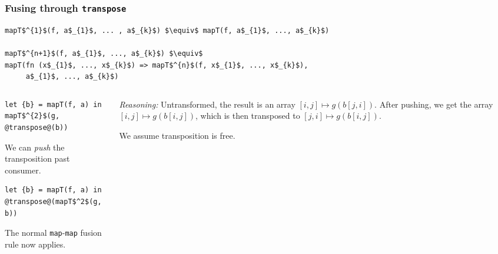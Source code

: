 \documentclass[rgb,dvipsnames]{beamer}
\begin{document}
\begin{frame}[fragile]
\frametitle{Fusing through \texttt{transpose}}

\begin{mdframed}
\scriptsize
\vspace{-1em}
\begin{lstlisting}[mathescape]
mapT$^{1}$(f, a$_{1}$, ... , a$_{k}$) $\equiv$ mapT(f, a$_{1}$, ..., a$_{k}$)

mapT$^{n+1}$(f, a$_{1}$, ..., a$_{k}$) $\equiv$
mapT(fn (x$_{1}$, ..., x$_{k}$) => mapT$^{n}$(f, x$_{1}$, ..., x$_{k}$),
     a$_{1}$, ..., a$_{k}$)
\end{lstlisting}
\vspace{-1em}
\end{mdframed}

\begin{columns}
\begin{column}{0.5\textwidth}
\begin{lstlisting}[mathescape]
let {b} = mapT(f, a) in
mapT$^{2}$(g, @transpose@(b))
\end{lstlisting}
We can \textit{push} the transposition past consumer.
\begin{lstlisting}[mathescape]
let {b} = mapT(f, a) in
@transpose@(mapT$^2$(g, b))
\end{lstlisting}
The normal \texttt{map}-\texttt{map} fusion rule now applies.
\end{column}
\begin{column}{0.5\textwidth}
  \textit{Reasoning:} Untransformed, the result is an array $[i,j]
  \mapsto g(b[j,i])$.  After pushing, we get the array $[i,j] \mapsto
  g(b[i,j])$, which is then transposed to $[j,i] \mapsto g(b[i,j])$.

  We assume transposition is free.
\end{column}
\end{columns}

\end{frame}
\end{document}
